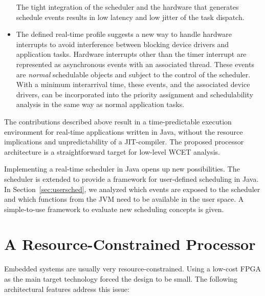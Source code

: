\begin{itemize}
The tight integration of the scheduler and the hardware that
generates schedule events results in low latency and low jitter of
the task dispatch.

    \item
%
The defined real-time profile suggests a new way to handle hardware
interrupts to avoid interference between blocking device drivers and
application tasks. Hardware interrupts other than the timer
interrupt are represented as asynchronous events with an associated
thread. These events are \emph{normal} schedulable objects and
subject to the control of the scheduler. With a minimum interarrival
time, these events, and the associated device drivers, can be
incorporated into the priority assignment and schedulability
analysis in the same way as normal application tasks.

\end{itemize}

The contributions described above result in a time-predictable
execution environment for real-time applications written in Java,
without the resource implications and unpredictability of a
JIT-compiler. The proposed processor architecture is a
straightforward target for low-level WCET analysis.


Implementing a real-time scheduler in Java opens up new
possibilities. The scheduler is extended to provide a framework for
user-defined scheduling in Java. In Section~\ref{sec:usersched}, we
analyzed which events are exposed to the scheduler and which
functions from the JVM need to be available in the user space. A
simple-to-use framework to evaluate new scheduling concepts is
given.



\section{A Resource-Constrained Processor}

Embedded systems are usually very resource-constrained. Using a
low-cost FPGA as the main target technology forced the design to be
small. The following architectural features address this issue:

